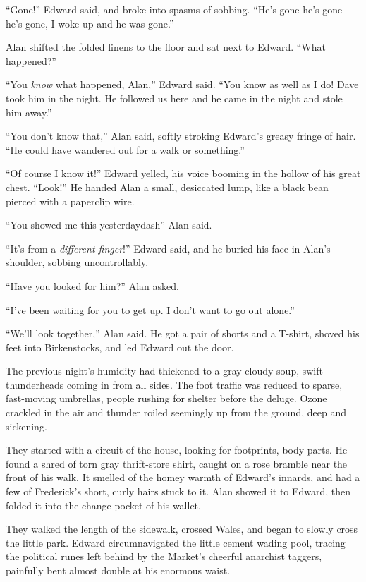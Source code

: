 ``Gone!'' Edward said, and broke into spasms of sobbing.  ``He's gone
he's gone he's gone, I woke up and he was gone.''

Alan shifted the folded linens to the floor and sat next to Edward. 
``What happened?''

``You \textit{know} what happened, Alan,'' Edward said.  ``You know as
well as I do!  Dave took him in the night.  He followed us here and he
came in the night and stole him away.''

``You don't know that,'' Alan said, softly stroking Edward's greasy
fringe of hair.  ``He could have wandered out for a walk or
something.''

``Of course I know it!'' Edward yelled, his voice booming in the
hollow of his great chest.  ``Look!'' He handed Alan a small,
desiccated lump, like a black bean pierced with a paperclip wire.

``You showed me this yesterdaydash{}'' Alan said.

``It's from a \textit{different finger}!'' Edward said, and he buried
his face in Alan's shoulder, sobbing uncontrollably.

``Have you looked for him?'' Alan asked.

``I've been waiting for you to get up.  I don't want to go out
alone.''

``We'll look together,'' Alan said.  He got a pair of shorts and a
T-shirt, shoved his feet into Birkenstocks, and led Edward out the
door.

The previous night's humidity had thickened to a gray cloudy soup,
swift thunderheads coming in from all sides.  The foot traffic was
reduced to sparse, fast-moving umbrellas, people rushing for shelter
before the deluge.  Ozone crackled in the air and thunder roiled
seemingly up from the ground, deep and sickening.

They started with a circuit of the house, looking for footprints, body
parts.  He found a shred of torn gray thrift-store shirt, caught on a
rose bramble near the front of his walk.  It smelled of the homey
warmth of Edward's innards, and had a few of Frederick's short, curly
hairs stuck to it.  Alan showed it to Edward, then folded it into the
change pocket of his wallet.

They walked the length of the sidewalk, crossed Wales, and began to
slowly cross the little park.  Edward circumnavigated the little
cement wading pool, tracing the political runes left behind by the
Market's cheerful anarchist taggers, painfully bent almost double at
his enormous waist.

